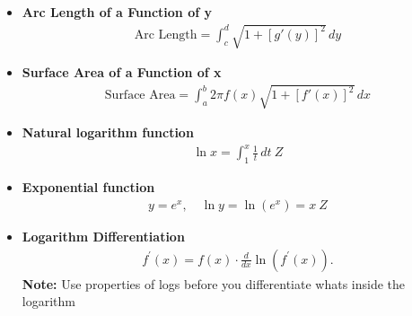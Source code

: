 \documentclass{report}
\begin{document}
\begin{itemize}
    \item \textbf{Arc Length of a Function of y}
    \begin{align}
        \text{Arc Length} = \int_{c}^{d} \sqrt{1 + [g'(y)]^2} \, dy
    \end{align}

    \item \textbf{Surface Area of a Function of x}
    \begin{align}
        \text{Surface Area} = \int_{a}^{b} 2\pi f(x) \sqrt{1 + [f'(x)]^2} \, dx
    \end{align}
    \item \textbf{Natural logarithm function}
    \begin{align}
        \ln x = \int_{1}^{x} \frac{1}{t} \, dt\ Z
    \end{align}

    \item \textbf{Exponential function}
    \begin{align}
        y = e^x, \quad \ln y = \ln(e^x) = x\ Z
    \end{align}

    \item  \textbf{Logarithm Differentiation}
    \begin{align*}
        f^{\prime}(x) = f(x) \cdot \frac{d}{dx}\ln{\left(f^{\prime}(x)\right)}
    .\end{align*}
    \textbf{Note:} Use properties of logs before you differentiate whats inside the logarithm


\end{itemize}
\end{document}
